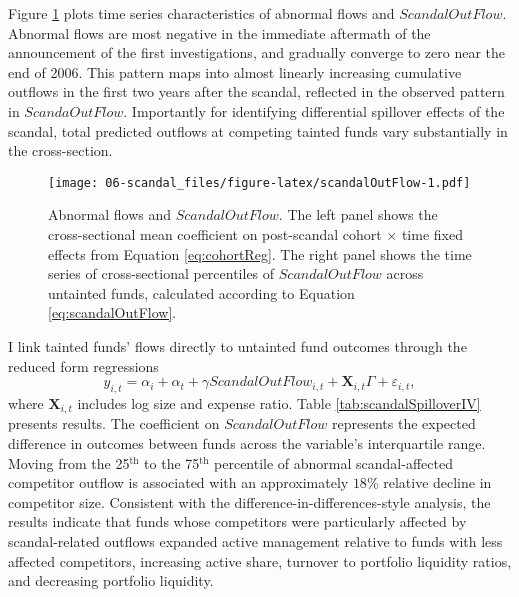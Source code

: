 \documentclass[]{book}
\theoremstyle{definition}
\theoremstyle{definition}
\theoremstyle{definition}
\theoremstyle{remark}
\begin{document}
Figure \ref{fig:scandalOutFlow} plots time series characteristics of
abnormal flows and \(ScandalOutFlow\). Abnormal flows are most negative
in the immediate aftermath of the announcement of the first
investigations, and gradually converge to zero near the end of 2006.
This pattern maps into almost linearly increasing cumulative outflows in
the first two years after the scandal, reflected in the observed pattern
in \(ScandaOutFlow\). Importantly for identifying differential spillover
effects of the scandal, total predicted outflows at competing tainted
funds vary substantially in the cross-section.

\begin{figure}
\centering
\texttt{[image: 06-scandal\_files/figure-latex/scandalOutFlow-1.pdf]}
\caption{\label{fig:scandalOutFlow}Abnormal flows and \(ScandalOutFlow\).
The left panel shows the cross-sectional mean coefficient on
post-scandal cohort \(\times\) time fixed effects from Equation
\eqref{eq:cohortReg}. The right panel shows the time series of
cross-sectional percentiles of \(ScandalOutFlow\) across untainted
funds, calculated according to Equation \eqref{eq:scandalOutFlow}.}
\end{figure}

I link tainted funds' flows directly to untainted fund outcomes through
the reduced form regressions \begin{equation}
    y_{i,t}=\alpha_i+\alpha_t+\gamma ScandalOutFlow_{i,t} + \mathbf{X}_{i,t}\Gamma + \varepsilon_{i,t},
\end{equation} where \(\mathbf{X}_{i,t}\) includes log size and expense
ratio. Table \ref{tab:scandalSpilloverIV} presents results. The
coefficient on \(ScandalOutFlow\) represents the expected difference in
outcomes between funds across the variable's interquartile range. Moving
from the 25\(^{\text{th}}\) to the 75\(^{\text{th}}\) percentile of
abnormal scandal-affected competitor outflow is associated with an
approximately \(18\)\% relative decline in competitor size. Consistent
with the difference-in-differences-style analysis, the results indicate
that funds whose competitors were particularly affected by
scandal-related outflows expanded active management relative to funds
with less affected competitors, increasing active share, turnover to
portfolio liquidity ratios, and decreasing portfolio liquidity.
\end{document}
